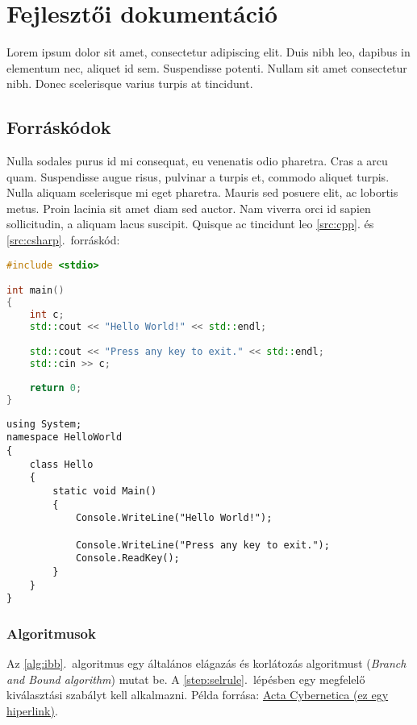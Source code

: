 \chapter{Fejlesztői dokumentáció}
\label{ch:impl}

Lorem ipsum dolor sit amet, consectetur adipiscing elit. Duis nibh leo, dapibus in elementum nec, aliquet id sem. Suspendisse potenti. Nullam sit amet consectetur nibh. Donec scelerisque varius turpis at tincidunt.

\section{Forráskódok}

Nulla sodales purus id mi consequat, eu venenatis odio pharetra. Cras a arcu quam. Suspendisse augue risus, pulvinar a turpis et, commodo aliquet turpis. Nulla aliquam scelerisque mi eget pharetra. Mauris sed posuere elit, ac lobortis metus. Proin lacinia sit amet diam sed auctor. Nam viverra orci id sapien sollicitudin, a aliquam lacus suscipit. Quisque ac tincidunt leo \ref{src:cpp}. és \ref{src:csharp}.~forráskód:

\begin{lstlisting}[language={C++}]
#include <stdio>

int main() 
{
	int c;
	std::cout << "Hello World!" << std::endl;

	std::cout << "Press any key to exit." << std::endl;
	std::cin >> c;
	
	return 0;
}
\end{lstlisting}

\begin{lstlisting}[language={[Sharp]C}]
using System;
namespace HelloWorld
{
	class Hello 
	{
		static void Main() 
		{
			Console.WriteLine("Hello World!");
			
			Console.WriteLine("Press any key to exit.");
			Console.ReadKey();
		}
	}
}
\end{lstlisting}

\subsection{Algoritmusok}

Az \ref{alg:ibb}.~algoritmus egy általános elágazás és korlátozás algoritmust (\emph{Branch and Bound algorithm}) mutat be. A \ref{step:selrule}.~lépésben egy megfelelő kiválasztási szabályt kell alkalmazni.
Példa forrása: \href{https://www.inf.u-szeged.hu/actacybernetica/}{Acta Cybernetica (ez egy hiperlink)}.

